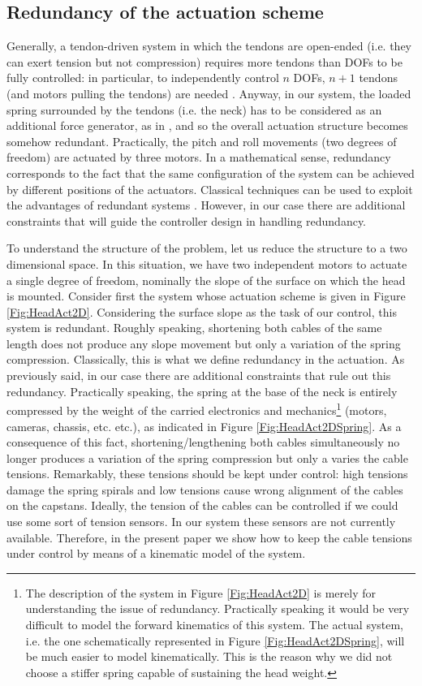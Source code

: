 \documentclass[conference]{IEEEtran}
\numberwithin{equation}{section}
\begin{document}
\subsection{Redundancy of the actuation scheme}

Generally, a tendon-driven system in which the tendons are open-ended (i.e. they can exert tension but not compression) requires more tendons than DOFs to be fully controlled: in particular, to independently control $n$ DOFs, $n+1$ tendons (and motors pulling the tendons) are needed \cite{Tsai}. Anyway, in our system, the loaded spring surrounded by the tendons (i.e. the neck) has to be considered as an additional force generator, as in \cite{Rovetta77}, and so the overall actuation structure becomes somehow redundant. Practically, the pitch and roll movements (two degrees of freedom) are actuated by three motors. In a mathematical sense, redundancy corresponds to the fact that the same configuration of the system can be achieved by different positions of the actuators. Classical techniques can be used to exploit the advantages of redundant systems \cite{SamsonEspiau}. However, in our case there are additional constraints that will guide the controller design in handling redundancy. 

To understand the structure of the problem, let us reduce the structure to a two dimensional space. In this situation, we have two independent motors to actuate a single degree of freedom, nominally the slope of the surface on which the head is mounted.
Consider first the system whose actuation scheme is given in Figure \ref{Fig:HeadAct2D}. Considering the surface slope as the task of our control, this system is redundant. Roughly speaking, shortening both cables of the same length does not produce any slope movement but only a variation of the spring compression. Classically, this is what we define redundancy in the actuation.
As previously said, in our case there are additional constraints that rule out this redundancy. Practically speaking, the spring at the base of the neck is entirely compressed by the weight of the carried electronics and mechanics\footnote{The description of the system in Figure \ref{Fig:HeadAct2D} is merely for understanding the issue of redundancy. Practically speaking it would be very difficult to model the forward kinematics of this system. The actual system, i.e. the one schematically represented in Figure \ref{Fig:HeadAct2DSpring}, will be much easier to model kinematically. This is the reason why we did not choose a stiffer spring capable of sustaining the head weight.} (motors, cameras, chassis, etc. etc.), as indicated in Figure \ref{Fig:HeadAct2DSpring}. As a consequence of this fact, shortening/lengthening both cables simultaneously no longer produces a variation of the spring compression but only a varies the cable tensions. Remarkably, these tensions should be kept under control: high tensions damage the spring spirals and low tensions cause wrong alignment of the cables on the capstans. Ideally, the tension of the cables can be controlled if we could use some sort of tension sensors. In our system these sensors are not currently available. Therefore, in the present paper we show how to keep the cable tensions under control by means of a kinematic model of the system.
\end{document}
